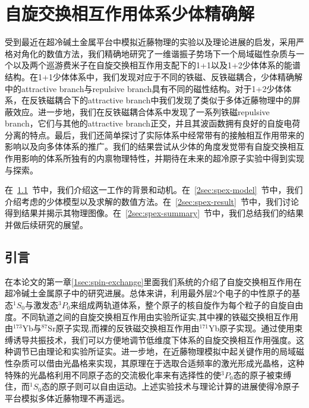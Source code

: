 \chapter{自旋交换相互作用体系少体精确解}\label{chap:kondo}

受到最近在超冷碱土金属平台中模拟近藤物理的实验以及理论进展的启发，采用严格对角化的数值方法，我们精确地研究了一维谐振子势场下一个局域磁性杂质与一个以及两个巡游费米子在自旋交换相互作用支配下的1+1以及1+2少体体系的能谱结构。在1+1少体体系中，我们发现对应于不同的铁磁、反铁磁耦合，少体精确解中的attractive branch与repulsive branch具有不同的磁性结构。对于1+2少体体系，在反铁磁耦合下的attractive branch中我们发现了类似于多体近藤物理中的屏蔽效应。进一步地，我们在反铁磁耦合体系中发现了一系列铁磁repulsive branch，它们与其他的attractive branch正交，并且其波函数拥有良好的自旋电荷分离的特点。最后，我们还简单探讨了实际体系中经常带有的接触相互作用带来的影响以及向多体体系的推广。我们的结果尝试从少体的角度发觉带有自旋交换相互作用影响的体系所独有的内禀物理特性，并期待在未来的超冷原子实验中得到实现与探索。

在~\ref{2sec:spex-intro}~节中，我们介绍这一工作的背景和动机。在~\ref{2sec:spex-model}~节中，我们介绍考虑的少体模型以及求解的数值方法。在~\ref{2sec:spex-result}~节中，我们讨论得到结果并揭示其物理图像。在~\ref{2sec:spex-summary}~节中，我们总结我们的结果并做后续研究的展望。

\section{引言}\label{2sec:spex-intro}
在本论文的第一章\ref{1sec:spin-exchange}里面我们系统的介绍了自旋交换相互作用在超冷碱土金属原子中的研究进展。总体来讲，利用最外层2个电子的中性原子的基态${}^1S_0$与激发态${}^3P_0$来组成两轨道体系，整个原子的核自旋作为每个粒子的自旋自由度。不同轨道之间的自旋交换相互作用由实验所证实,其中裸的铁磁交换相互作用由${}^{173}$Yb\cite{scazza2014observation,cappellini2014direct}与${}^{87}$Sr\cite{zhang2014spectroscopic}原子实现,而裸的反铁磁交换相互作用由${}^{171}$Yb\cite{ono2019antiferromagnetic}原子实现。通过使用束缚诱导共振技术，我们可以方便地调节低维度下体系的自旋交换相互作用强度。这种调节已由理论和实验所证实\cite{zhang2016kondo,cheng2017enhancing,zhang2018control,ji2018confinement,zhang2020tight,zhang2020controlling,riegger2018localized}。进一步地，在近藤物理模拟中起关键作用的局域磁性杂质可以借由光晶格来实现，其原理在于选取合适频率的激光形成光晶格，这种特殊的光晶格利用不同原子态的交流极化率来有选择性的使${}^3P_0$态的原子被束缚住，而${}^1S_0$态的原子则可以自由运动\cite{riegger2018localized,barber2008optical}。上述实验技术与理论计算的进展使得冷原子平台模拟多体近藤物理不再遥远。

